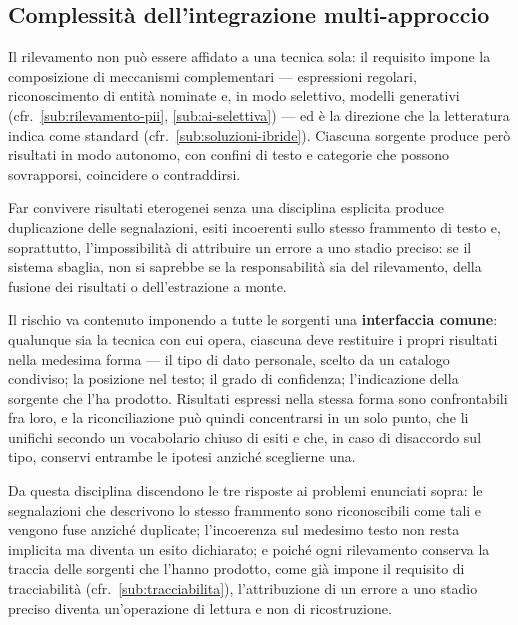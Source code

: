 \subsection{Complessità dell'integrazione multi-approccio}
\label{sub:rischio-integrazione}
Il rilevamento non può essere affidato a una tecnica sola: il requisito impone la composizione di meccanismi complementari --- espressioni regolari, riconoscimento di entità nominate e, in modo selettivo, modelli generativi (cfr.~\ref{sub:rilevamento-pii}, \ref{sub:ai-selettiva}) --- ed è la direzione che la letteratura indica come standard (cfr.~\ref{sub:soluzioni-ibride}). Ciascuna sorgente produce però risultati in modo autonomo, con confini di testo e categorie che possono sovrapporsi, coincidere o contraddirsi. \medskip

Far convivere risultati eterogenei senza una disciplina esplicita produce duplicazione delle segnalazioni, esiti incoerenti sullo stesso frammento di testo e, soprattutto, l'impossibilità di attribuire un errore a uno stadio preciso: se il sistema sbaglia, non si saprebbe se la responsabilità sia del rilevamento, della fusione dei risultati o dell'estrazione a monte. \medskip

Il rischio va contenuto imponendo a tutte le sorgenti una \textbf{interfaccia comune}: qualunque sia la tecnica con cui opera, ciascuna deve restituire i propri risultati nella medesima forma --- il tipo di dato personale, scelto da un catalogo condiviso; la posizione nel testo; il grado di confidenza; l'indicazione della sorgente che l'ha prodotto. Risultati espressi nella stessa forma sono confrontabili fra loro, e la riconciliazione può quindi concentrarsi in un solo punto, che li unifichi secondo un vocabolario chiuso di esiti e che, in caso di disaccordo sul tipo, conservi entrambe le ipotesi anziché sceglierne una. \medskip

Da questa disciplina discendono le tre risposte ai problemi enunciati sopra: le segnalazioni che descrivono lo stesso frammento sono riconoscibili come tali e vengono fuse anziché duplicate; l'incoerenza sul medesimo testo non resta implicita ma diventa un esito dichiarato; e poiché ogni rilevamento conserva la traccia delle sorgenti che l'hanno prodotto, come già impone il requisito di tracciabilità (cfr.~\ref{sub:tracciabilita}), l'attribuzione di un errore a uno stadio preciso diventa un'operazione di lettura e non di ricostruzione.

